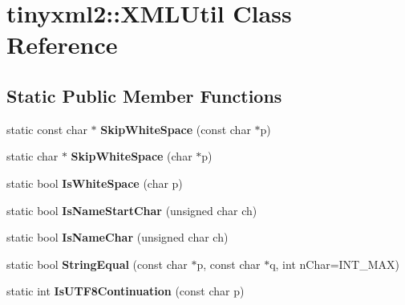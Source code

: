 \hypertarget{classtinyxml2_1_1_x_m_l_util}{}\section{tinyxml2\+:\+:X\+M\+L\+Util Class Reference}
\label{classtinyxml2_1_1_x_m_l_util}
\subsection*{Static Public Member Functions}
\begin{DoxyCompactItemize}
\item 
static const char $\ast$ {\bfseries Skip\+White\+Space} (const char $\ast$p)\hypertarget{classtinyxml2_1_1_x_m_l_util_a9333d20f2a34325b5115ca45849c4b2a}{}\label{classtinyxml2_1_1_x_m_l_util_a9333d20f2a34325b5115ca45849c4b2a}

\item 
static char $\ast$ {\bfseries Skip\+White\+Space} (char $\ast$p)\hypertarget{classtinyxml2_1_1_x_m_l_util_aa48025be8843ec5a79b65579d31bd8fc}{}\label{classtinyxml2_1_1_x_m_l_util_aa48025be8843ec5a79b65579d31bd8fc}

\item 
static bool {\bfseries Is\+White\+Space} (char p)\hypertarget{classtinyxml2_1_1_x_m_l_util_a357ec3af8fc433d19023a815f45e8e33}{}\label{classtinyxml2_1_1_x_m_l_util_a357ec3af8fc433d19023a815f45e8e33}

\item 
static bool {\bfseries Is\+Name\+Start\+Char} (unsigned char ch)\hypertarget{classtinyxml2_1_1_x_m_l_util_abe106a69ac4d942a4381a4d9dfd0e0bd}{}\label{classtinyxml2_1_1_x_m_l_util_abe106a69ac4d942a4381a4d9dfd0e0bd}

\item 
static bool {\bfseries Is\+Name\+Char} (unsigned char ch)\hypertarget{classtinyxml2_1_1_x_m_l_util_a04b17341538fa11752f24b4301d19485}{}\label{classtinyxml2_1_1_x_m_l_util_a04b17341538fa11752f24b4301d19485}

\item 
static bool {\bfseries String\+Equal} (const char $\ast$p, const char $\ast$q, int n\+Char=I\+N\+T\+\_\+\+M\+AX)\hypertarget{classtinyxml2_1_1_x_m_l_util_acfcd287cacfd2533e1bc9ea4dfb56602}{}\label{classtinyxml2_1_1_x_m_l_util_acfcd287cacfd2533e1bc9ea4dfb56602}

\item 
static int {\bfseries Is\+U\+T\+F8\+Continuation} (const char p)\hypertarget{classtinyxml2_1_1_x_m_l_util_a24ba87b1d22528167a3d16c4f52096bf}{}\label{classtinyxml2_1_1_x_m_l_util_a24ba87b1d22528167a3d16c4f52096bf}


\end{DoxyCompactItemize}
